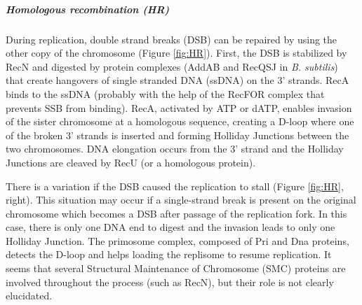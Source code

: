 \subparagraph{Homologous recombination (HR)} During replication, double strand breaks (DSB) can be repaired by using the other copy of the chromosome (Figure \ref{fig:HR}). First, the DSB is stabilized by RecN and digested by protein complexes (AddAB and RecQSJ in \textit{B. subtilis}) that create hangovers of single stranded DNA (ssDNA) on the 3' strands. RecA binds to the ssDNA (probably with the help of the RecFOR complex that prevents SSB from binding). RecA, activated by ATP or dATP, enables invasion of the sister chromosome at a homologous sequence, creating a D-loop where one of the broken 3' strands is inserted and forming Holliday Junctions between the two chromosomes. DNA elongation occurs from the 3' strand and the Holliday Junctions are cleaved by RecU (or a homologous protein).

There is a variation if the DSB caused the replication to stall (Figure \ref{fig:HR}, right). This situation may occur if a single-strand break is present on the original chromosome which becomes a DSB after passage of the replication fork. In this case, there is only one DNA end to digest and the invasion leads to only one Holliday Junction. The primosome complex, composed of Pri and Dna proteins, detects the D-loop and helps loading the replisome to resume replication. It seems that several Structural Maintenance of Chromosome (SMC) proteins are involved throughout the process (such as RecN), but their role is not clearly elucidated.

